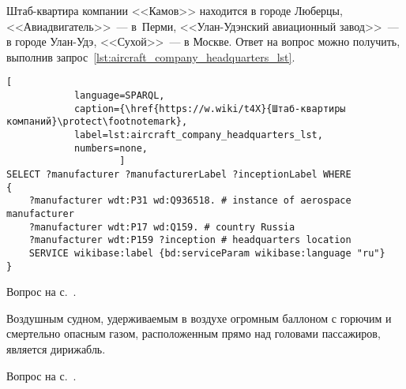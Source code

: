 \begin{task}
    \label{answer:aircraft_company_headquarters}
Штаб-квартира компании <<Камов>> находится в городе Люберцы, 
    <<Авиадвигатель>>~--- в~Перми, 
    <<Улан-Удэнский авиационный завод>>~--- в городе Улан-Удэ, 
    <<Сухой>>~--- в Москве. 
    Ответ на вопрос можно получить, выполнив запрос~\ref{lst:aircraft_company_headquarters_lst}. 
   

\newpage
\begin{lstlisting}[ 
            language=SPARQL, 
            caption={\href{https://w.wiki/t4X}{Штаб-квартиры компаний}\protect\footnotemark}, 
            label=lst:aircraft_company_headquarters_lst, 
            numbers=none,
                    ]
SELECT ?manufacturer ?manufacturerLabel ?inceptionLabel WHERE
{
    ?manufacturer wdt:P31 wd:Q936518. # instance of aerospace manufacturer
  	?manufacturer wdt:P17 wd:Q159. # country Russia
  	?manufacturer wdt:P159 ?inception # headquarters location
    SERVICE wikibase:label {bd:serviceParam wikibase:language "ru"}
}
\end{lstlisting}
    
    \small{\AnswerBackref Вопрос на с.~\pageref{aircraft_question_3}.}
\end{task}


\begin{task}
    \label{answer:aircraft_question_airship}
Воздушным судном, удерживаемым в воздухе огромным баллоном 
    с горючим и смертельно опасным газом, 
    расположенным прямо над головами пассажиров, является дирижабль. 
    
    \small{\AnswerBackref Вопрос на с.~\pageref{aircraft_question_4}.}
\end{task}




